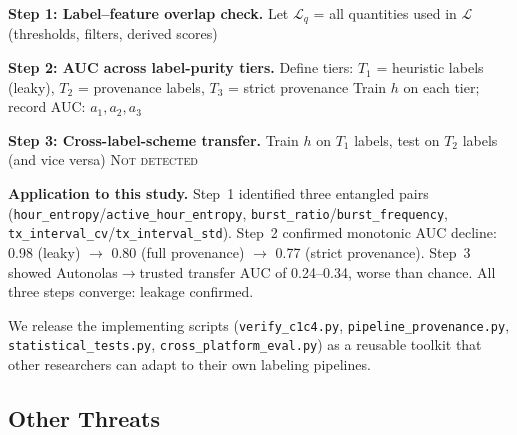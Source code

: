 \documentclass[sigconf,nonacm=false]{acmart}
\begin{document}
\begin{algorithm}[t]
\SetAlgoLined
{}

\textbf{Step 1: Label--feature overlap check.}\;
Let $\mathcal{L}_q$ = all quantities used in $\mathcal{L}$ (thresholds, filters, derived scores)\;

\BlankLine
\textbf{Step 2: AUC across label-purity tiers.}\;
Define tiers: $T_1$ = heuristic labels (leaky), $T_2$ = provenance labels, $T_3$ = strict provenance\;
Train $h$ on each tier; record AUC: $a_1, a_2, a_3$\;

\BlankLine
\textbf{Step 3: Cross-label-scheme transfer.}\;
Train $h$ on $T_1$ labels, test on $T_2$ labels (and vice versa)\;
\Return \textsc{Not detected}\;
\caption{Three-Step Leakage Audit for Behavioral Classifiers}
\label{alg:leakage_audit}
\end{algorithm}

\textbf{Application to this study.} Step~1 identified three entangled pairs (\texttt{hour\_entropy}/\texttt{active\_hour\_entropy}, \texttt{burst\_ratio}/\texttt{burst\_frequency}, \texttt{tx\_interval\_cv}/\texttt{tx\_interval\_std}). Step~2 confirmed monotonic AUC decline: 0.98 (leaky) $\to$ 0.80 (full provenance) $\to$ 0.77 (strict provenance). Step~3 showed Autonolas$\to$trusted transfer AUC of 0.24--0.34, worse than chance. All three steps converge: leakage confirmed.

We release the implementing scripts (\texttt{verify\_c1c4.py}, \texttt{pipeline\_provenance.py}, \texttt{statistical\_tests.py}, \texttt{cross\_platform\_eval.py}) as a reusable toolkit that other researchers can adapt to their own labeling pipelines.

\subsection{Other Threats}
\end{document}
